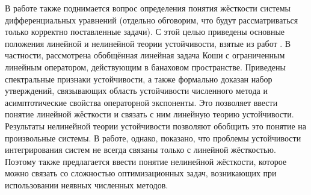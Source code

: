 В работе также поднимается вопрос определения понятия жёсткости системы дифференциальных уравнений
(отдельно обговорим, что будут рассматриваться только корректно поставленные задачи).
С этой целью приведены основные положения линейной и нелинейной теории устойчивости, взятые из работ
\cite{dahlquist1975stability, dahlquist1963special, lambert1991methods, heirer1999solvingode2}.
В частности, рассмотрена обобщённая линейная задача Коши с ограниченным линейным оператором, действующим в банаховом пространстве.
Приведены спектральные признаки устойчивости, а также формально доказан набор утверждений,
связывающих область устойчивости численного метода и асимптотические свойства операторной экспоненты.
Это позволяет ввести понятие линейной жёсткости и связать с ним линейную теорию устойчивости.
Результаты нелинейной теории устойчивости позволяют обобщить это понятие на произвольные системы.
В работе, однако, показано, что проблемы устойчивости интегрирования систем не всегда связаны только с линейной жёсткостью.
Поэтому также предлагается ввести понятие нелинейной жёсткости,
которое можно связать со сложностью оптимизационных задач,
возникающих при использовании неявных численных методов.
